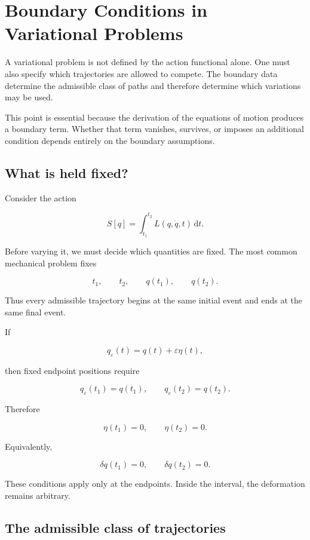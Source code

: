 \section{Boundary Conditions in Variational Problems}
\label{sec:boundary_conditions_variational_problems}

A variational problem is not defined by the action functional alone. One must also specify which trajectories are allowed to compete. The boundary data determine the admissible class of paths and therefore determine which variations may be used.

This point is essential because the derivation of the equations of motion produces a boundary term. Whether that term vanishes, survives, or imposes an additional condition depends entirely on the boundary assumptions.

\subsection{What is held fixed?}

Consider the action

\[
S[q]
=
\int_{t_{1}}^{t_{2}}
L(q,\dot q,t)
\,\mathrm{d}t.
\]

Before varying it, we must decide which quantities are fixed. The most common mechanical problem fixes

\[
t_{1},
\qquad
t_{2},
\qquad
q(t_{1}),
\qquad
q(t_{2}).
\]

Thus every admissible trajectory begins at the same initial event and ends at the same final event.

If

\[
q_{\varepsilon}(t)
=
q(t)+\varepsilon\eta(t),
\]

then fixed endpoint positions require

\[
q_{\varepsilon}(t_{1})=q(t_{1}),
\qquad
q_{\varepsilon}(t_{2})=q(t_{2}).
\]

Therefore

\[
\boxed{
\eta(t_{1})=0,
\qquad
\eta(t_{2})=0
}.
\]

Equivalently,

\[
\delta q(t_{1})=0,
\qquad
\delta q(t_{2})=0.
\]

These conditions apply only at the endpoints. Inside the interval, the deformation remains arbitrary.

\subsection{The admissible class of trajectories}

